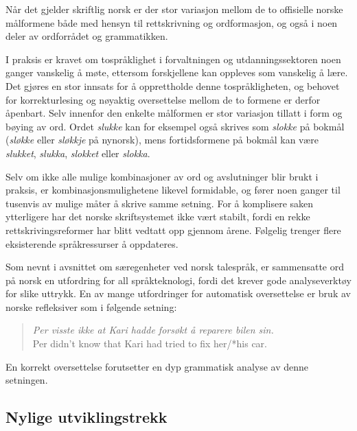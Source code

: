 \begin{multicols}{2}
Når det gjelder skriftlig norsk er der stor variasjon mellom de to offisielle norske målformene både med hensyn til rettskrivning og ordformasjon, og også i noen deler av ordforrådet og grammatikken. 

I praksis er kravet om tospråklighet i forvaltningen og utdanningssektoren noen ganger vanskelig å møte, ettersom forskjellene kan oppleves som vanskelig å lære. Det gjøres en stor innsats for å opprettholde denne tospråkligheten, og behovet for korrekturlesing og nøyaktig oversettelse mellom de to formene er derfor åpenbart.
Selv innenfor den enkelte målformen er stor variasjon tillatt i form og bøying av ord. Ordet \textit{slukke} kan for eksempel også skrives som \textit{slokke} på bokmål (\textit{sløkke} eller \textit{sløkkje} på nynorsk), mens fortidsformene på bokmål kan være \textit{slukket}, \textit{slukka}, \textit{slokket} eller \textit{slokka}. 


Selv om ikke alle mulige kombinasjoner av ord og avslutninger blir brukt i praksis, er kombinasjonsmulighetene likevel formidable, og fører noen ganger til tusenvis av mulige måter å skrive samme setning.
For å komplisere saken ytterligere har det norske skriftsystemet ikke vært stabilt, fordi en rekke rettskrivingsreformer har blitt vedtatt opp gjennom årene. Følgelig trenger flere eksisterende språkressurser å oppdateres.

Som nevnt i avsnittet om særegenheter ved norsk talespråk, er sammensatte ord på norsk en utfordring for all språkteknologi, fordi det krever gode analyseverktøy for slike uttrykk.
En av mange utfordringer for automatisk oversettelse er bruk av norske refleksiver som i følgende setning:

\begin{quote}
	\emph{Per visste ikke at Kari hadde forsøkt å reparere bilen \emph{sin}.}\\
	Per didn’t know that Kari had tried to fix her/*his car.
\end{quote}

En korrekt oversettelse forutsetter en dyp grammatisk analyse av denne setningen.

\subsection{Nylige utviklingstrekk}


\end{multicols}
